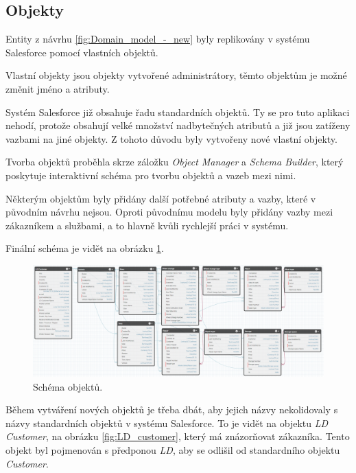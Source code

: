 \subsection{Objekty}
Entity z návrhu \ref{fig:Domain_model_-_new} byly replikovány v systému Salesforce pomocí vlastních objektů. 

Vlastní objekty jsou objekty vytvořené administrátory, těmto objektům je možné změnit jméno a atributy.

Systém Salesforce již obsahuje řadu standardních objektů. Ty se pro tuto aplikaci nehodí, protože obsahují velké množství nadbytečných atributů a již jsou zatíženy vazbami na jiné objekty. Z tohoto důvodu byly vytvořeny nové vlastní objekty. 

Tvorba objektů proběhla skrze záložku \emph{Object Manager} a \emph{Schema Builder}, který poskytuje interaktivní schéma pro tvorbu objektů a vazeb mezi nimi. 

Některým objektům byly přidány další potřebné atributy a vazby, které v původním návrhu nejsou. Oproti původnímu modelu byly přidány vazby mezi zákazníkem a službami, a to hlavně kvůli rychlejší práci v systému.

Finální schéma je vidět na obrázku \ref{fig:Object_schema_builder}.
\begin{figure}
    \centering
    \includegraphics[width=\textwidth]{assets/7_implementace/aplikace_a_objekty/Schema builder.png}
    \caption{Schéma objektů.}
    \label{fig:Object_schema_builder}
\end{figure}
\FloatBarrier

Během vytváření nových objektů je třeba dbát, aby jejich názvy nekolidovaly s názvy standardních objektů v systému Salesforce. To je vidět na objektu \emph{LD Customer}, na obrázku \ref{fig:LD_customer}, který má znázorňovat zákazníka. Tento objekt byl pojmenován s předponou \emph{LD}, aby se odlišil od standardního objektu \emph{Customer}. 

